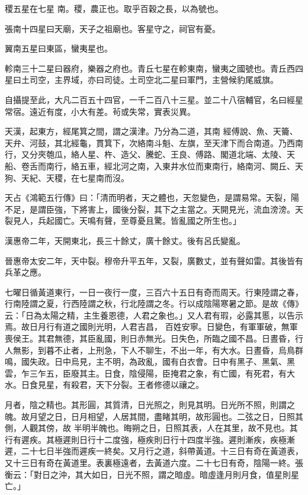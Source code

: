 \begin{pinyinscope}
 稷五星在七星
 南。稷，農正也。取乎百穀之長，以為號也。



 張南十四星曰天廟，天子之祖廟也。客星守之，祠官有憂。



 翼南五星曰東區，蠻夷星也。



 軫南三十二星曰器府，樂器之府也。青丘七星在軫東南，蠻夷之國號也。青丘西四星曰土司空，主界域，亦曰司徒。土司空北二星曰軍門，主營候豹尾威旗。



 自攝提至此，大凡二百五十四官，一千二百八十三星。並二十八宿輔官，名曰經星常宿。遠近有度，小大有差。茍或失常，實表災異。



 天漢，起東方，經尾箕之間，謂之漢津。乃分為二道，其南
 經傅說、魚、天籥、天弁、河鼓，其北經龜，貫箕下，次絡南斗魁、左旗，至天津下而合南道。乃西南行，又分夾匏瓜，絡人星、杵、造父、騰蛇、王良、傅路、閣道北端、太陵、天船、卷舌而南行，絡五車，經北河之南，入東井水位而東南行，絡南河、闕丘、天狗、天紀、天稷，在七星南而沒。



 天占《鴻範五行傳》曰：「清而明者，天之體也，天忽變色，是謂易常。天裂，陽不足，是謂臣強，下將害上，國後分裂，其下之主當之。天開見光，流血滂滂。天裂見人，兵起國亡。天鳴有聲，至尊憂且驚。皆亂國之所生也。」



 漢惠帝二年，天開東北，長三十餘丈，廣十餘丈。後有呂氏變亂。



 晉惠帝太安二年，天中裂。穆帝升平五年，又裂，廣數丈，並有聲如雷。其後皆有兵革之應。



 七曜日循黃道東行，一日一夜行一度，三百六十五日有奇而周天。行東陸謂之春，行南陸謂之夏，行西陸謂之秋，行北陸謂之冬。行以成陰陽寒暑之節。是故《傳》云：「日為太陽之精，主生養恩德，人君之象也。」又人君有瑕，必露其慝，以告示焉。故日月行有道之國則光明，人君吉昌，
 百姓安寧。日變色，有軍軍破，無軍喪侯王。其君無德，其臣亂國，則日赤無光。日失色，所臨之國不昌。日晝昏，行人無影，到暮不止者，上刑急，下人不聊生，不出一年，有大水。日晝昏，烏鳥群鳴，國失政。日中烏見，主不明，為政亂，國有白衣會。日中有黑子、黑氣、黑雲，乍三乍五，臣廢其主。日食，陰侵陽，臣掩君之象，有亡國，有死君，有大水。日食見星，有殺君，天下分裂。王者修德以禳之。



 月者，陰之精也。其形圓，其質清，日光照之，則見其明。日光所不照，則謂之魄。故月望之日，日月相望，人居其間，盡睹其明，故形圓也。二弦之日，日照其側，人觀其傍，故
 半明半魄也。晦朔之日，日照其表，人在其里，故不見也。其行有遲疾。其極遲則日行十二度強，極疾則日行十四度半強。遲則漸疾，疾極漸遲，二十七日半強而遲疾一終矣。又月行之道，斜帶黃道。十三日有奇在黃道表，又十三日有奇在黃道里。表裏極遠者，去黃道六度。二十七日有奇，陰陽一終。張衡云：「對日之沖，其大如日，日光不照，謂之暗虛。暗虛逢月則月食，值星則星亡。」




\end{pinyinscope}
